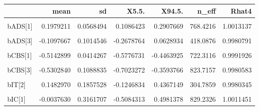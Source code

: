 \documentclass[10pt,dvipsnames,enabledeprecatedfontcommands]{scrartcl}
\begin{document}
\begin{table}
\centering\begingroup\fontsize{9}{11}\selectfont

\begin{tabular}{lrrrrrr}
\toprule
  & mean & sd & X5.5. & X94.5. & n\_eff & Rhat4\\
\midrule
\cellcolor{gray!6}{a} & \cellcolor{gray!6}{0.0414089} & \cellcolor{gray!6}{0.1562753} & \cellcolor{gray!6}{-0.2037740} & \cellcolor{gray!6}{0.2796946} & \cellcolor{gray!6}{228.1593} & \cellcolor{gray!6}{0.9980513}\\
bADS[1] & 0.1979211 & 0.0568494 & 0.1086423 & 0.2907669 & 768.4216 & 1.0013137\\
\cellcolor{gray!6}{bADS[2]} & \cellcolor{gray!6}{0.2484756} & \cellcolor{gray!6}{0.1546028} & \cellcolor{gray!6}{0.0036955} & \cellcolor{gray!6}{0.4942282} & \cellcolor{gray!6}{526.1494} & \cellcolor{gray!6}{0.9995921}\\
bADS[3] & -0.1097667 & 0.1014546 & -0.2678764 & 0.0628934 & 418.0876 & 0.9980791\\
\cellcolor{gray!6}{bADSIC} & \cellcolor{gray!6}{-0.0042060} & \cellcolor{gray!6}{0.0051643} & \cellcolor{gray!6}{-0.0122338} & \cellcolor{gray!6}{0.0040408} & \cellcolor{gray!6}{361.1195} & \cellcolor{gray!6}{0.9983620}\\
\addlinespace
bCBS[1] & -0.5142899 & 0.0414267 & -0.5776731 & -0.4463925 & 722.3116 & 0.9991926\\
\cellcolor{gray!6}{bCBS[2]} & \cellcolor{gray!6}{-0.0919148} & \cellcolor{gray!6}{0.1245614} & \cellcolor{gray!6}{-0.2965873} & \cellcolor{gray!6}{0.1059034} & \cellcolor{gray!6}{671.6673} & \cellcolor{gray!6}{0.9998084}\\
bCBS[3] & -0.5302840 & 0.1088835 & -0.7023272 & -0.3593766 & 823.7157 & 0.9980583\\
\cellcolor{gray!6}{bIT[1]} & \cellcolor{gray!6}{-0.0212337} & \cellcolor{gray!6}{0.1630179} & \cellcolor{gray!6}{-0.2603815} & \cellcolor{gray!6}{0.2295494} & \cellcolor{gray!6}{219.0190} & \cellcolor{gray!6}{0.9980137}\\
bIT[2] & 0.1482970 & 0.1857528 & -0.1246834 & 0.4367149 & 304.7859 & 0.9980345\\
\addlinespace
\cellcolor{gray!6}{bIT[3]} & \cellcolor{gray!6}{-0.0686005} & \cellcolor{gray!6}{0.1776783} & \cellcolor{gray!6}{-0.3448157} & \cellcolor{gray!6}{0.2099344} & \cellcolor{gray!6}{295.3412} & \cellcolor{gray!6}{0.9980482}\\
bIC[1] & -0.0037630 & 0.3161707 & -0.5084313 & 0.4981378 & 829.2326 & 1.0011451\\

\end{tabular}
\end{table}
\end{document}

